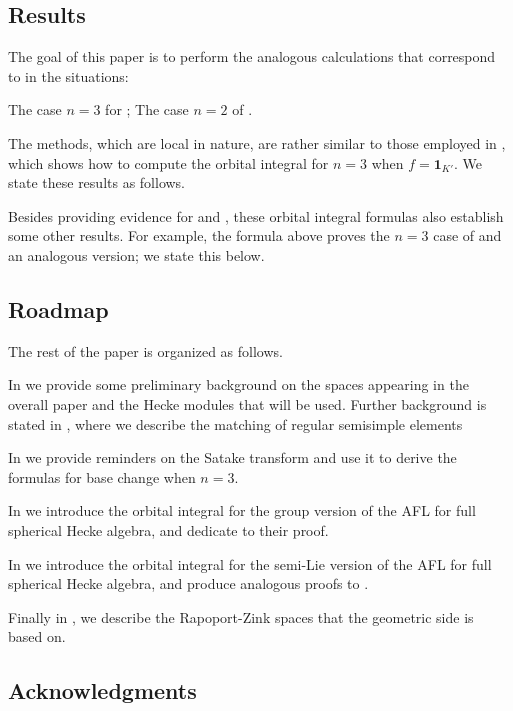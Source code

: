 \subsection{Results}
The goal of this paper is to perform the analogous calculations
that correspond to \cite[Lemma 7.1.1 and Proposition 7.3.2]{ref:AFLspherical} in the situations:
\begin{itemize}
  \ii The case $n = 3$ for ;
  \ii The case $n = 2$ of .
\end{itemize}
The methods, which are local in nature,
are rather similar to those employed in \cite{ref:AFL},
which shows how to compute the orbital integral for $n = 3$ when $f = \mathbf{1}_{K'}$.
We state these results as follows.

\begin{theorem}
\end{theorem}

Besides providing evidence for  and ,
these orbital integral formulas also establish some other results.
For example, the formula above
proves the $n = 3$ case of \cite[Conjecture 8.2.1]{ref:AFLspherical}
and an analogous version; we state this below.

\begin{theorem}
\end{theorem}

\subsection{Roadmap}
The rest of the paper is organized as follows.
\begin{itemize}
  \ii In  we provide some preliminary background
  on the spaces appearing in the overall paper and the Hecke modules that will be used.
  Further background is stated in ,
  where we describe the matching of regular semisimple elements

  \ii In  we provide reminders on the Satake transform
  and use it to derive the formulas for base change when $n = 3$.

  \ii In  we introduce the orbital integral
  for the group version of the AFL for full spherical Hecke algebra,
  and dedicate  to their proof.

  \ii In  we introduce the orbital integral
  for the semi-Lie version of the AFL for full spherical Hecke algebra,
  and produce analogous proofs to .

  \ii Finally in , we describe the Rapoport-Zink spaces
  that the geometric side is based on.
\end{itemize}


\subsection{Acknowledgments}
